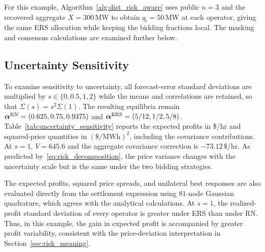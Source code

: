 \documentclass[journal]{IEEEtran}
\begin{document}
For this example, Algorithm~\ref{alg:dist_risk_aware} uses public $n=3$ and the recovered aggregate $X=300$\,MW to obtain $q_i=50$\,MW at each operator, giving the same ERS allocation while keeping the bidding fractions local. The masking and consensus calculations are examined further below.

\subsection{Uncertainty Sensitivity}
\label{sec:sensitivity}
To examine sensitivity to uncertainty, all forecast-error standard deviations are multiplied by $s\in\{0,0.5,1,2\}$ while the means and correlations are retained, so that $\Sigma(s)=s^2\Sigma(1)$. The resulting equilibria remain $\boldsymbol\alpha^{\rm RN}=(0.625,0.75,0.9375)$ and $\boldsymbol\alpha^{\rm ERS}=(5/12,1/2,5/8)$. Table~\ref{tab:uncertainty_sensitivity} reports the expected profits in \$/hr and squared-price quantities in $(\$/\mathrm{MWh})^2$, including the covariance contributions. At $s=1$, $V=645.6$ and the aggregate covariance correction is $-73.12$\,\$/hr. As predicted by~\eqref{eq:risk_decomposition}, the price variance changes with the uncertainty scale but is the same under the two bidding strategies.

\begin{table}[t]
\centering
\caption{Uncertainty sensitivity: full expected profits, including covariance offsets. Standard deviations are scaled by $s$; forecast means and prescribed coefficients are fixed.}
\label{tab:uncertainty_sensitivity}
\end{table}

The expected profits, squared price spreads, and unilateral best responses are also evaluated directly from the settlement expression using $81$-node Gaussian quadrature, which agrees with the analytical calculations. At $s=1$, the realized-profit standard deviation of every operator is greater under ERS than under RN. Thus, in this example, the gain in expected profit is accompanied by greater profit variability, consistent with the price-deviation interpretation in Section~\ref{sec:risk_meaning}.
\end{document}
